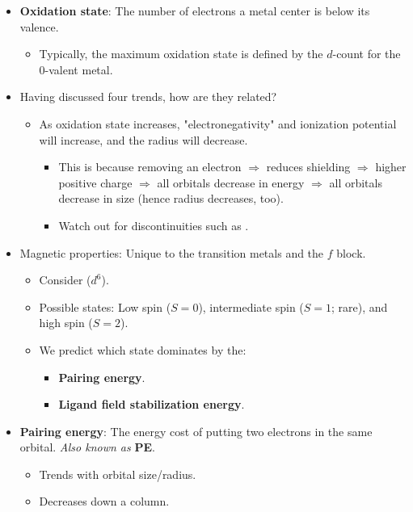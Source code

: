 \documentclass[../notes.tex]{subfiles}
\begin{document}
\begin{itemize}
    \item \textbf{Oxidation state}: The number of electrons a metal center is below its valence.
    \begin{itemize}
        \item Typically, the maximum oxidation state is defined by the $d$-count for the 0-valent metal.
    \end{itemize}
    \item Having discussed four trends, how are they related?
    \begin{itemize}
        \item As oxidation state increases, "electronegativity" and ionization potential will increase, and the radius will decrease.
        \begin{itemize}
            \item This is because removing an electron $\Rightarrow$ reduces shielding $\Rightarrow$ higher positive charge $\Rightarrow$ all orbitals decrease in energy $\Rightarrow$ all orbitals decrease in size (hence radius decreases, too).
            \item Watch out for discontinuities such as .
        \end{itemize}
    \end{itemize}
    \item Magnetic properties: Unique to the transition metals and the $f$ block.
    \begin{itemize}
        \item Consider  ($d^6$).
        \item Possible states: Low spin ($S=0$), intermediate spin ($S=1$; rare), and high spin ($S=2$).
        \item We predict which state dominates by the:
        \begin{itemize}
            \item \textbf{Pairing energy}.
            \item \textbf{Ligand field stabilization energy}.
        \end{itemize}
    \end{itemize}
    \item \textbf{Pairing energy}: The energy cost of putting two electrons in the same orbital. \emph{Also known as} \textbf{PE}.
    \begin{itemize}
        \item Trends with orbital size/radius.
        \item Decreases down a column.
    \end{itemize}

\end{itemize}
\end{document}

